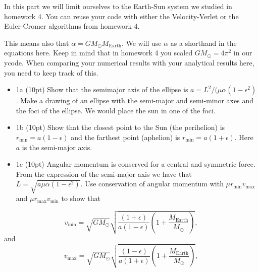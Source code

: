 \documentclass[%
oneside,                 %
final,                   %
10pt]{article}
\begin{document}
In this part we will limit ourselves to the Earth-Sun system we studied in homework 4. You can reuse your code with either the Velocity-Verlet or the Euler-Cromer algorithms from homework 4.

This means also that $\alpha=GM_{\odot}M_{\mathrm{Earth}}$. We will use $\alpha$ as a shorthand in the equations here. Keep in mind that in homework 4 you scaled $GM_{\odot}=4\pi^2$ in our ycode. When comparing your numerical results with your analytical results here, you need to keep track of this.

\begin{itemize}
\item 1a (10pt) Show that the semimajor axis of the ellipse is $a=L^2/(\mu\alpha(1-\epsilon^2)$. Make a drawing of an ellipse with the semi-major and semi-minor axes and the foci of the ellipse. We would place the sun in one of the foci.  

\item 1b (10pt) Show that the closest point to the Sun (the perihelion) is $r_{\mathrm{min}}=a(1-\epsilon)$ and the farthest point (aphelion) is $r_{\mathrm{min}}=a(1+\epsilon)$. Here $a$ is the semi-major axis.

\item 1c (10pt) Angular momentum is conserved for a central and symmetric force.  From the expression of the semi-major axis we have that $L=\sqrt{a\mu\alpha(1-\epsilon^2)}$. Use conservation of angular momentum with $\mu r_{\mathrm{min}}v_{\mathrm{max}}$ and $\mu r_{\mathrm{max}}v_{\mathrm{min}}$ to show that
\end{itemize}

\noindent
\[
v_{\mathrm{min}}=\sqrt{GM_{\odot}}\sqrt{\frac{(1+\epsilon)}{a(1-\epsilon)}(1+\frac{M_{\mathrm{Earth}}}{M_{\odot}})},
\]
and 
\[
v_{\mathrm{max}}=\sqrt{GM_{\odot}}\sqrt{\frac{(1-\epsilon)}{a(1+\epsilon)}(1+\frac{M_{\mathrm{Earth}}}{M_{\odot}})},
\]
\end{document}
